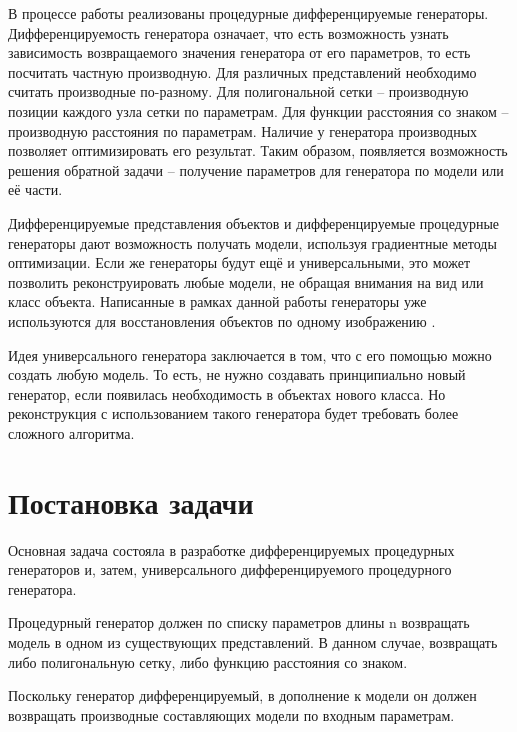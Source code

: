 \documentclass[a4paper,hidelinks,12pt]{article}
\begin{document}
В процессе работы реализованы процедурные дифференцируемые генераторы. Дифференцируемость генератора означает, что есть возможность узнать зависимость возвращаемого значения генератора от его параметров, то есть посчитать частную производную. Для различных представлений необходимо считать производные по-разному. Для полигональной сетки – производную позиции каждого узла сетки по параметрам. Для функции расстояния со знаком – производную расстояния по параметрам. Наличие у генератора производных позволяет оптимизировать его результат. Таким образом, появляется возможность решения обратной задачи – получение параметров для генератора по модели или её части. 
\par
Дифференцируемые представления объектов и дифференцируемые процедурные генераторы дают возможность получать модели, используя градиентные методы оптимизации. Если же генераторы будут ещё и универсальными, это может позволить реконструировать любые модели, не обращая внимания на вид или класс объекта. Написанные в рамках данной работы генераторы уже используются для восстановления объектов по одному изображению \cite{garifullin2023diff} \cite{garifullin2024single}.
\par
Идея универсального генератора заключается в том, что с его помощью можно создать любую модель. То есть, не нужно создавать принципиально новый генератор, если появилась необходимость в объектах нового класса. Но реконструкция с использованием такого генератора будет требовать более сложного алгоритма. 



\section{Постановка задачи}
Основная задача состояла в разработке дифференцируемых процедурных генераторов и, затем, универсального дифференцируемого процедурного генератора.
\par
Процедурный генератор должен по списку параметров длины n возвращать модель в одном из существующих представлений. В данном случае, возвращать либо полигональную сетку, либо функцию расстояния со знаком.
\par
Поскольку генератор дифференцируемый, в дополнение к модели он должен возвращать производные составляющих модели по входным параметрам.
\end{document}
